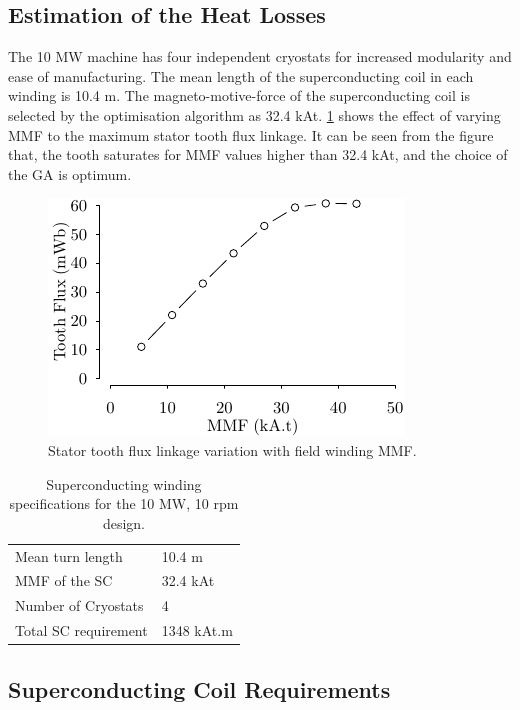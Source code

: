 \documentclass[12pt]{iopart}
\begin{document}
\subsection{Estimation of the Heat Losses}

The 10 MW machine has four independent cryostats for increased modularity and ease of manufacturing. The mean length of the superconducting coil in each winding is 10.4 m. The magneto-motive-force of the superconducting coil is selected by the optimisation algorithm as 32.4 kAt. \ref{10MW_varying_MMF} shows the effect of varying MMF to the maximum stator tooth flux linkage. It can be seen from the figure that, the tooth saturates for MMF values higher than 32.4 kAt, and the choice of the GA is optimum.


\begin{figure}[t]
  \centering
    \includegraphics[]{10MW_varying_MMF}
  \caption{Stator tooth flux linkage variation with field winding MMF.}
  \label{10MW_varying_MMF}
\end{figure}

\begin{table}[t]
  \centering
  \begin{tabular}{ll}
\hline
Mean turn length & 10.4 m \\
MMF of the SC & 32.4 kAt \\
Number of Cryostats & 4 \\
Total SC requirement & 1348 kAt.m \\
\hline
 \end{tabular}
  \caption{Superconducting winding specifications for the 10 MW, 10 rpm design.}
  \label{10MW_hts_spec}
\end{table}


\subsection{Superconducting Coil Requirements}
\end{document}
